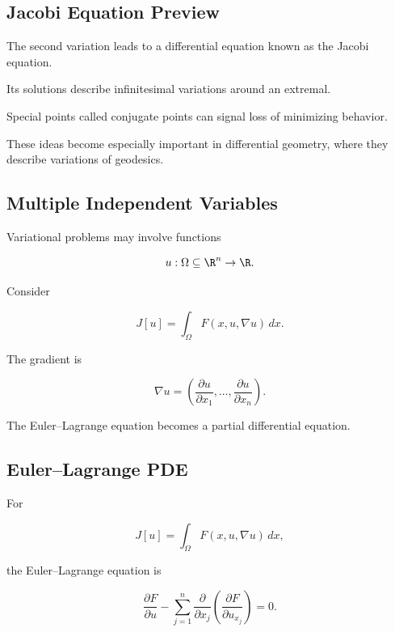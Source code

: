 \subsection{Jacobi Equation Preview}
\label{subsec:jacobi-equation-preview}

The second variation leads to a differential equation known as the
Jacobi equation.

Its solutions describe infinitesimal variations around an extremal.

Special points called conjugate points can signal loss of minimizing
behavior.

These ideas become especially important in differential geometry, where
they describe variations of geodesics.

\subsection{Multiple Independent Variables}
\label{subsec:multiple-independent-variables}

Variational problems may involve functions

\[
u:\Omega\subseteq\R^n\to\R.
\]

Consider

\[
\boxed{
J[u]
=
\int_\Omega
F(x,u,\nabla u)\,dx.
}
\]

The gradient is

\[
\boxed{
\nabla u
=
\left(
\frac{\partial u}{\partial x_1},
\ldots,
\frac{\partial u}{\partial x_n}
\right).
}
\]

The Euler--Lagrange equation becomes a partial differential equation.

\subsection{Euler--Lagrange PDE}
\label{subsec:euler-lagrange-pde}

For

\[
J[u]
=
\int_\Omega
F(x,u,\nabla u)\,dx,
\]

the Euler--Lagrange equation is

\[
\boxed{
\frac{\partial F}{\partial u}
-
\sum_{j=1}^{n}
\frac{\partial}{\partial x_j}
\left(
\frac{\partial F}
{\partial u_{x_j}}
\right)
=
0.
}
\]

